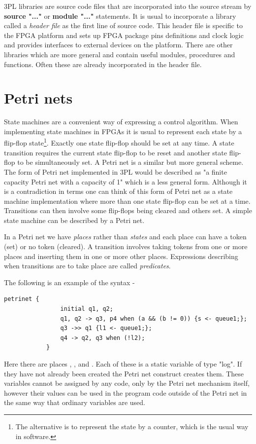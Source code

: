         3PL libraries are source code files that are incorporated into the source
        stream by {\bf source "..."} or {\bf module "..."} statements. It is usual to
        incorporate a library called a {\em header file} as the first line of source
        code. This header file is specific to the FPGA platform and sets up FPGA
        package pins definitions and clock logic and provides interfaces to
        external devices on the platform. There are other libraries which are more
        general and contain useful modules, procedures and functions. Often these
        are already incorporated in the header file.



    \section{Petri nets}

        State machines are a convenient way of expressing a control algorithm. When
        implementing state machines in FPGAs it is usual to represent each state
        by a flip-flop state\footnote{The alternative is to represent the state
        by a counter, which is the usual way in software.}. Exactly one state
        flip-flop should be set at any time. A state transition requires the
        current state flip-flop to be reset and another state flip-flop to be
        simultaneously set. A Petri net is a similar but more general scheme.
        The form of Petri net implemented in 3PL would be described as "a finite
        capacity Petri net with a capacity of 1" which is a less general form.
        Although it is a contradiction in terms one can think of this form of
        Petri net as a state machine implementation where more than one state
        flip-flop can be set at a time. Transitions can then involve some
        flip-flops being cleared and others set. A simple state machine can
        be described by a Petri net.

        In a Petri net we have {\em places} rather than {\em states} and each place
        can have a token (set) or no token (cleared). A transition involves taking
        tokens from one or more places and inserting them in one or more other places.
        Expressions describing when transitions are to take place are called
        {\em predicates}.

        The following is an example of the syntax -
        \begin{lstlisting}[language=threepl]
            petrinet {
                initial q1, q2;
                q1, q2 -> q3, p4 when (a && (b != 0)) {s <- queue1;};
                q3 ->> q1 {l1 <- queue1;};
                q4 -> q2, q3 when (!l2);
            }
        \end{lstlisting}
        Here there are places , ,  and . Each of these
        is a static variable of type "log". If they have not already been created the
        Petri net construct creates them. These variables cannot be assigned by any
        code, only by the Petri net mechanism itself, however their values can be used
        in the program code outside of the Petri net in the same way that ordinary
        variables are used.

